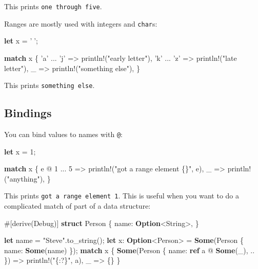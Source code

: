 \documentclass[a4paper,]{book}
\newenvironment{Shaded}{\begin{snugshade}}{\end{snugshade}}
\newcommand{\KeywordTok}[1]{\textcolor[rgb]{0.13,0.29,0.53}{\textbf{{#1}}}}
\newcommand{\DecValTok}[1]{\textcolor[rgb]{0.00,0.00,0.81}{{#1}}}
\newcommand{\CharTok}[1]{\textcolor[rgb]{0.31,0.60,0.02}{{#1}}}
\newcommand{\StringTok}[1]{\textcolor[rgb]{0.31,0.60,0.02}{{#1}}}
\newcommand{\OtherTok}[1]{\textcolor[rgb]{0.56,0.35,0.01}{{#1}}}
\newcommand{\NormalTok}[1]{{#1}}
\begin{document}
This prints \texttt{one\ through\ five}.

Ranges are mostly used with integers and \texttt{char}s:

\begin{Shaded}
\begin{Highlighting}[]
\KeywordTok{let} \NormalTok{x = }\CharTok{'💅'}\NormalTok{;}

\KeywordTok{match} \NormalTok{x \{}
    \CharTok{'a'} \NormalTok{... }\CharTok{'j'} \NormalTok{=> }\OtherTok{println!}\NormalTok{(}\StringTok{"early letter"}\NormalTok{),}
    \CharTok{'k'} \NormalTok{... }\CharTok{'z'} \NormalTok{=> }\OtherTok{println!}\NormalTok{(}\StringTok{"late letter"}\NormalTok{),}
    \NormalTok{_ => }\OtherTok{println!}\NormalTok{(}\StringTok{"something else"}\NormalTok{),}
\NormalTok{\}}
\end{Highlighting}
\end{Shaded}

This prints \texttt{something\ else}.

\subsection{Bindings}\label{bindings}

You can bind values to names with \texttt{@}:

\begin{Shaded}
\begin{Highlighting}[]
\KeywordTok{let} \NormalTok{x = }\DecValTok{1}\NormalTok{;}

\KeywordTok{match} \NormalTok{x \{}
    \NormalTok{e @ }\DecValTok{1} \NormalTok{... }\DecValTok{5} \NormalTok{=> }\OtherTok{println!}\NormalTok{(}\StringTok{"got a range element \{\}"}\NormalTok{, e),}
    \NormalTok{_ => }\OtherTok{println!}\NormalTok{(}\StringTok{"anything"}\NormalTok{),}
\NormalTok{\}}
\end{Highlighting}
\end{Shaded}

This prints \texttt{got\ a\ range\ element\ 1}. This is useful when you
want to do a complicated match of part of a data structure:

\begin{Shaded}
\begin{Highlighting}[]
\OtherTok{#[}\NormalTok{derive}\OtherTok{(}\NormalTok{Debug}\OtherTok{)]}
\KeywordTok{struct} \NormalTok{Person \{}
    \NormalTok{name: }\KeywordTok{Option}\NormalTok{<String>,}
\NormalTok{\}}

\KeywordTok{let} \NormalTok{name = }\StringTok{"Steve"}\NormalTok{.to_string();}
\KeywordTok{let} \NormalTok{x: }\KeywordTok{Option}\NormalTok{<Person> = }\KeywordTok{Some}\NormalTok{(Person \{ name: }\KeywordTok{Some}\NormalTok{(name) \});}
\KeywordTok{match} \NormalTok{x \{}
    \KeywordTok{Some}\NormalTok{(Person \{ name: }\KeywordTok{ref} \NormalTok{a @ }\KeywordTok{Some}\NormalTok{(_), .. \}) => }\OtherTok{println!}\NormalTok{(}\StringTok{"\{:?\}"}\NormalTok{, a),}
    \NormalTok{_ => \{\}}
\NormalTok{\}}
\end{Highlighting}
\end{Shaded}
\end{document}
